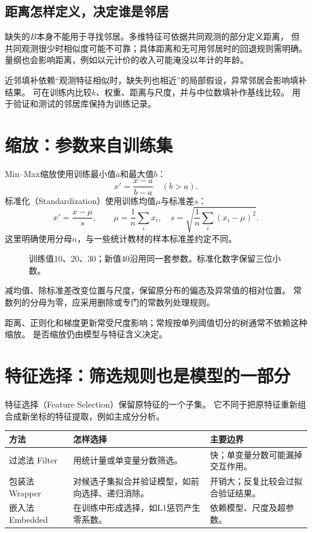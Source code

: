 \subsection{距离怎样定义，决定谁是邻居}
缺失的$B$本身不能用于寻找邻居。多维特征可依据共同观测的部分定义距离，
但共同观测很少时相似度可能不可靠；具体距离和无可用邻居时的回退规则需明确。
量纲也会影响距离，例如以元计价的收入可能淹没以年计的年龄。

近邻填补依赖“观测特征相似时，缺失列也相近”的局部假设，异常邻居会影响填补结果。
可在训练内比较$k$、权重、距离与尺度，并与中位数填补作基线比较。
用于验证和测试的邻居库保持为训练记录。

\section{缩放：参数来自训练集}
\label{sec:data-scaling}
Min--Max缩放使用训练最小值$a$和最大值$b$：
\[
 x'=\frac{x-a}{b-a}\quad (b>a).
\]
标准化（Standardization）使用训练均值$\mu$与标准差$s$：
\[
 x'=\frac{x-\mu}{s},\qquad
 \mu=\frac1n\sum_i x_i,\quad s=\sqrt{\frac1n\sum_i(x_i-\mu)^2}.
\]
这里明确使用分母$n$，与一些统计教材的样本标准差约定不同。

\begin{figure}[htbp]
\centering
\caption{训练值10、20、30；新值40沿用同一套参数。标准化数字保留三位小数。}
\par\smallskip
{}
\end{figure}

\begin{pitfall}[标准化的作用范围]
减均值、除标准差改变位置与尺度，保留原分布的偏态及异常值的相对位置。
常数列的分母为零，应采用删除或专门的常数列处理规则。
\end{pitfall}
距离、正则化和梯度更新常受尺度影响；常规按单列阈值切分的树通常不依赖这种缩放。
是否缩放仍由模型与特征含义决定。

\section{特征选择：筛选规则也是模型的一部分}
\label{sec:data-selection}
特征选择（Feature Selection）保留原特征的一个子集。
它不同于把原特征重新组合成新坐标的特征提取，例如主成分分析。

\begin{center}
\begin{tabularx}{\textwidth}{P{26mm}P{49mm}Y}
\toprule
方法 & 怎样选择 & 主要边界\\
\midrule
过滤法 Filter & 用统计量或单变量分数筛选。 & 快；单变量分数可能漏掉交互作用。\\
包装法 Wrapper & 对候选子集拟合并验证模型，如前向选择、递归消除。 & 开销大；反复比较会过拟合验证结果。\\
嵌入法 Embedded & 在训练中形成选择，如L1惩罚产生零系数。 & 依赖模型、尺度及超参数。\\
\bottomrule
\end{tabularx}
\end{center}

